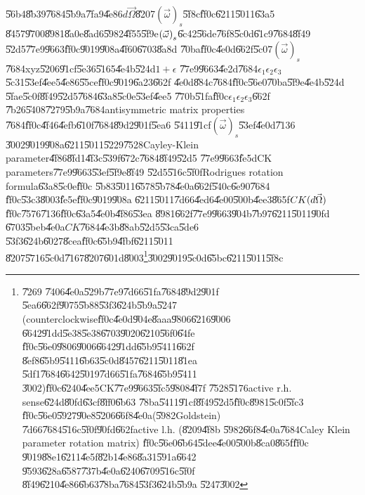 \documentclass[12pt,a4paper]{article}
\begin{document}
\U{56b4}\U{8b39}\U{7684}\U{5b9a}\U{7fa9}\U{4e86}$d\vec{\Omega}$\U{8207}$%
\left( \vec{\omega}\right) _{s}$\U{5f8c}\U{ff0c}\U{6211}\U{5011}\U{63a5}%
\U{8457}\U{9700}\U{8981}\U{8a0e}\U{8ad6}\U{5982}\U{4f55}\U{5f9e}$\left( \vec{%
\omega}\right) _{s}$\U{6c42}\U{56de}\U{76f8}\U{5c0d}\U{61c9}\U{7684}\U{8f49}%
\U{52d5}\U{77e9}\U{9663}\U{ff0c}\U{9019}\U{908a}\U{4f60}\U{6703}\U{8a8d}%
\U{70ba}\U{ff0c}\U{4e0d}\U{662f}\U{5c07}$\left( \vec{\omega}\right) _{s}$%
\U{7684}xyz\U{5206}\U{91cf}\U{5e36}\U{5165}\U{4e4b}\U{524d}$1+\epsilon $%
\U{77e9}\U{9663}\U{4e2d}\U{7684}$\epsilon _{1}\epsilon _{2}\epsilon _{3}$%
\U{5c31}\U{53ef}\U{4ee5}\U{4e86}\U{55ce}\U{ff0c}\U{9019}\U{6a23}\U{662f}%
\U{4e0d}\U{884c}\U{7684}\U{ff0c}\U{56e0}\U{70ba}\U{5f9e}\U{4e4b}\U{524d}%
\U{5fae}\U{5c0f}\U{8f49}\U{52d5}\U{7684}\U{63a8}\U{5c0e}\U{53ef}\U{4ee5}%
\U{770b}\U{51fa}\U{ff0c}$\epsilon _{1}\epsilon _{2}\epsilon _{3}$\U{662f}%
\U{7b26}\U{5408}\U{7279}\U{5b9a}\U{7684}antisymmetric matrix properties%
\U{7684}\U{ff0c}\U{4f46}\U{4efb}\U{610f}\U{7684}\U{89d2}\U{901f}\U{5ea6}%
\U{5411}\U{91cf}$\left( \vec{\omega}\right) _{s}$\U{53ef}\U{4e0d}\U{7136}%
\U{3002}\U{9019}\U{908a}\U{6211}\U{5011}\U{5229}\U{7528}Cayley-Klein
parameter\U{4f86}\U{8fd1}\U{4f3c}\U{539f}\U{672c}\U{7684}\U{8f49}\U{52d5}%
\U{77e9}\U{9663}\U{fe5d}CK parameters\U{77e9}\U{9663}\U{53ef}\U{5f9e}\U{8f49}%
\U{52d5}\U{516c}\U{5f0f}Rodrigues rotation formula\U{63a8}\U{5c0e}\U{ff0c}%
\U{5b83}\U{5011}\U{6578}\U{5b78}\U{4e0a}\U{662f}\U{540c}\U{6e90}\U{7684}%
\U{ff0c}\U{53c3}\U{8003}\cite{goldstein}\U{fe5e}\U{ff0c}\U{9019}\U{908a}%
\U{6211}\U{5011}\U{7d66}\U{4ed6}\U{4e00}\U{500b}\U{4ee3}\U{865f}$CK(d\vec{%
\Omega})$\U{ff0c}\U{7576}\U{7136}\U{ff0c}\U{63a5}\U{4e0b}\U{4f86}\U{53ea}%
\U{8981}\U{662f}\U{77e9}\U{9663}\U{904b}\U{7b97}\U{6211}\U{5011}\U{90fd}%
\U{6703}\U{5beb}\U{4e0a}$CK$\U{7684}\U{4e3b}\U{88ab}\U{52d5}\U{53ca}\U{5de6}%
\U{53f3}\U{624b}\U{6027}\U{8cea}\U{ff0c}\U{65b9}\U{4fbf}\U{6211}\U{5011}%
\U{8207}\U{5716}\U{5c0d}\U{7167}\U{8207}\U{601d}\U{8003}\footnote{\U{7269}%
\U{7406}\U{4e0a}\U{529b}\U{77e9}\U{7d66}\U{51fa}\U{7684}\U{89d2}\U{901f}%
\U{5ea6}\U{662f}\U{9075}\U{5b88}\U{53f3}\U{624b}\U{5b9a}\U{5247}%
(counterclockwise\U{ff0c}\U{4e0d}\U{904e}\U{8aaa}\U{9806}\U{6216}\U{9006}%
\U{6642}\U{91dd}\U{5e38}\U{5e38}\U{6703}\U{9020}\U{6210}\U{56f0}\U{64fe}%
\U{ff0c}\U{56e0}\U{9806}\U{9006}\U{6642}\U{91dd}\U{65b9}\U{5411}\U{662f}%
\U{8ef8}\U{65b9}\U{5411}\U{6b63}\U{5c0d}\U{8457}\U{6211}\U{5011}\U{81ea}%
\U{5df1}\U{7684}\U{6642}\U{5019}\U{7d66}\U{51fa}\U{7684}\U{65b9}\U{5411}%
\U{3002})\U{ff0c}\U{6240}\U{4ee5}CK\U{77e9}\U{9663}\U{5fc5}\U{9808}\U{4f7f}%
\U{7528}\U{5176}active r.h. sense\U{624d}\U{80fd}\U{63cf}\U{8ff0}\U{6b63}%
\U{78ba}\U{5411}\U{91cf}\U{8f49}\U{52d5}\U{ff0c}\U{8981}\U{5c0f}\U{5fc3}%
\U{ff0c}\U{56e0}\U{5927}\U{90e8}\U{5206}\U{66f8}\U{4e0a}(\U{5982}Goldstein)%
\U{7d66}\U{7684}\U{516c}\U{5f0f}\U{90fd}\U{662f}active l.h. (\U{8209}\U{4f8b}%
\U{5982}\U{66f8}\U{4e0a}\U{7684}Caley Klein parameter rotation matrix)%
\U{ff0c}\U{56e0}\U{6b64}\U{5dee}\U{4e00}\U{500b}\U{8ca0}\U{865f}\U{ff0c}%
\U{9019}\U{88e1}\U{6211}\U{4e5f}\U{82b1}\U{4e86}\U{8a31}\U{591a}\U{6642}%
\U{9593}\U{628a}\U{6587}\U{737b}\U{4e0a}\U{6240}\U{6709}\U{516c}\U{5f0f}%
\U{8f49}\U{6210}\U{4e86}\U{6b63}\U{78ba}\U{7684}\U{53f3}\U{624b}\U{5b9a}%
\U{5247}\U{3002}}\U{3002}\U{9019}\U{5c0d}\U{65bc}\U{6211}\U{5011}\U{5f8c}%
\end{document}
